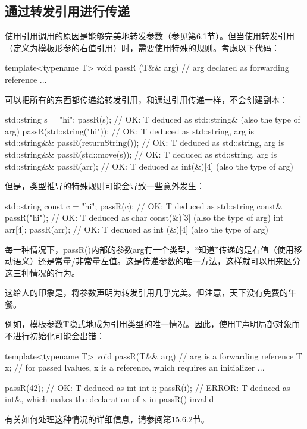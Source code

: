 \subsection{通过转发引用进行传递}

使用引用调用的原因是能够完美地转发参数（参见第6.1节）。但当使用转发引用（定义为模板形参的右值引用）时，需要使用特殊的规则。考虑以下代码：

\begin{cpp}
template<typename T>
void passR (T&& arg) { // arg declared as forwarding reference
	...
}
\end{cpp}

可以把所有的东西都传递给转发引用，和通过引用传递一样，不会创建副本：

\begin{cpp}
std::string s = "hi";
passR(s); // OK: T deduced as std::string& (also the type of arg)
passR(std::string("hi")); // OK: T deduced as std::string, arg is std::string&&
passR(returnString()); // OK: T deduced as std::string, arg is std::string&&
passR(std::move(s)); // OK: T deduced as std::string, arg is std::string&&
passR(arr); // OK: T deduced as int(&)[4] (also the type of arg)
\end{cpp}

但是，类型推导的特殊规则可能会导致一些意外发生：

\begin{cpp}
std::string const c = "hi";
passR(c); // OK: T deduced as std::string const&
passR("hi"); // OK: T deduced as char const(&)[3] (also the type of arg)
int arr[4];
passR(arr); // OK: T deduced as int (&)[4] (also the type of arg)
\end{cpp}

每一种情况下，passR()内部的参数arg有一个类型，“知道”传递的是右值（使用移动语义）还是常量/非常量左值。这是传递参数的唯一方法，这样就可以用来区分这三种情况的行为。

这给人的印象是，将参数声明为转发引用几乎完美。但注意，天下没有免费的午餐。

例如，模板参数T隐式地成为引用类型的唯一情况。因此，使用T声明局部对象而不进行初始化可能会出错：

\begin{cpp}
template<typename T>
void passR(T&& arg) { // arg is a forwarding reference
	T x; // for passed lvalues, x is a reference, which requires an initializer
	...
}

passR(42); // OK: T deduced as int
int i;
passR(i); // ERROR: T deduced as int&, which makes the declaration of x in passR() invalid
\end{cpp}

有关如何处理这种情况的详细信息，请参阅第15.6.2节。




















